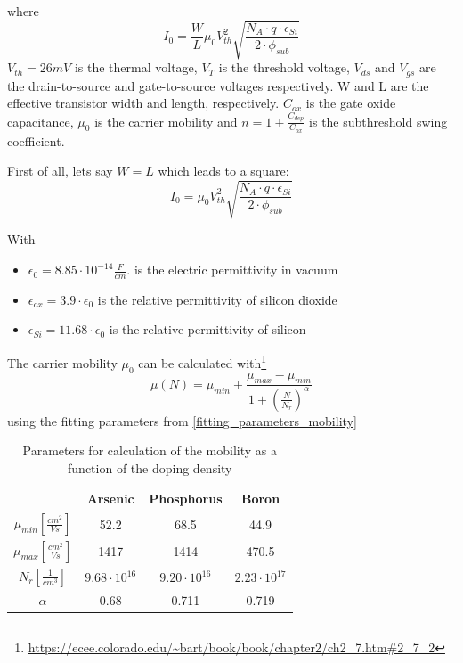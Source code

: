 where
\begin{equation}
I_0 = \frac{W}{L} \mu_0 V_{th}^2 \sqrt{\frac{N_A \cdot q \cdot \epsilon_{Si}}{2 \cdot \phi_{sub}}}
\end{equation}
$V_{th}=26mV$ is the thermal voltage, $V_T$ is the threshold voltage, $V_{ds}$ and $V_{gs}$ are the drain-to-source and gate-to-source voltages respectively.
W and L are the effective transistor width and length, respectively. $C_{ox}$ is the gate oxide capacitance, $\mu_0$ is the carrier mobility and $n=1+\frac{C_{dep}}{C_{ox}}$ is the subthreshold swing coefficient.

First of all, lets say $W=L$ which leads to a square:
\begin{equation}
I_0 = \mu_0 V_{th}^2 \sqrt{\frac{N_A \cdot q \cdot \epsilon_{Si}}{2 \cdot \phi_{sub}}}
\end{equation}

With
\begin{itemize}
\item $\epsilon_0 = 8.85 \cdot 10^{-14}\frac{F}{cm}. $ is the electric permittivity in vacuum
\item $\epsilon_{ox} =3.9 \cdot \epsilon_0$ is the relative permittivity of silicon dioxide
\item $\epsilon_{Si} =11.68 \cdot \epsilon_0$ is the relative permittivity of silicon
\end{itemize}

The carrier mobility $ \mu_0$ can be calculated with\footnote{\url{https://ecee.colorado.edu/\~bart/book/book/chapter2/ch2_7.htm\#2_7_2}}
\begin{equation}
 \mu(N) =  \mu_{min} + \frac{ \mu_{max}- \mu_{min}}{1+\left(\frac{N}{N_r}\right)^\alpha}
\end{equation}
using the fitting parameters from \autoref{fitting_parameters_mobility}

\begin{table}[H]
	\centering
	\begin{tabular}{|c|c|c|c|}
		\hline
		{} &
		\textbf{Arsenic} &	
		\textbf{Phosphorus} &
		\textbf{Boron} \\
		\hline
		$\mu_{min} [\frac{cm^2}{Vs}]$ &
		52.2 &
		68.5 &		
		44.9 \\
		\hline
		$\mu_{max} [\frac{cm^2}{Vs}]$ &
		1417 &
		1414 &
		470.5 \\
		\hline
		$N_r [\frac{1}{cm^3}]$ &
		$9.68 \cdot 10^{16}$ &
		$9.20 \cdot 10^{16}$ &
		$2.23 \cdot 10^{17}$ \\
		\hline
		$\alpha$ &
		0.68 &
		0.711 &
		0.719 \\
		\hline
	\end{tabular}
	\caption{Parameters for calculation of the mobility as a function of the doping density}
	\label{fitting_parameters_mobility}
\end{table}

